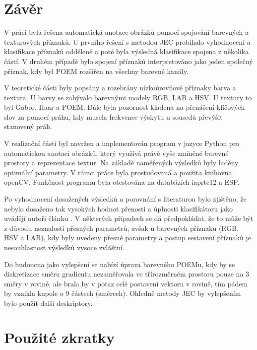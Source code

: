 \documentclass[czech,BP]{thesiskiv}
\begin{document}
\chapter{Závěr}
\par V práci byla řešena automatická anotace obrázků pomocí spojování barevných a texturových příznaků. U prvního řešení s metodou JEC probíhalo vyhodnocení a klasifikace příznaků odděleně a poté byla výsledná klasifikace spojena z několika částí. V druhém případě bylo spojení příznaků interpretováno jako jeden společný příznak, kdy byl POEM rozšířen na všechny barevné kanály.
\par V teoretické části byly popsány a rozebrány nízkoúrovňové příznaky barva a textura. U barvy se zabývalo barevnými modely RGB, LAB a HSV. U textury to byl Gabor, Haar a POEM. Dále byla pozornost kladena na přenášení klíčových slov za pomocí práhu, kdy musela frekvence výskytu u sousedů převýšit stanovený práh. 
\par V realizační části byl navržen a implementován program v jazyce Python pro automatickou anotaci obrázků, který využívá právě vyše zmíněné barevné prostory a reprezentace textur. Na základě naměřených výsledků byly laděny optimální parametry. V rámci práce byla prostudovaná a použita knihovna openCV. Funkčnost programu byla otestována na databázích iaprtc12 a ESP.
\par Po vyhodnocení dosažených výsledků a porovnání s literaturou bylo zjištěno, že nebylo dosaženo tak vysokých hodnot přenosti a úplnosti klasifikátoru jako uvádějí autoři článku \citep{JEC2}. V některých případech se dá předpokládat, že to může být z důvodu neznalosti přesných parametrů, avšak u barevných příznaku (RGB, HSV a LAB), kdy byly uvedeny přesné parametry a postup sestavení příznaků je nesouhlasnost výsledků vysoce zvláštní. 
\par Do budoucna jako vylepšení se nabízí úprava barevného POEMu, kdy by se diskretizace směru gradientu nezaměřovala ve třírozměrném prostoru pouze na 3 směry v rovině, ale brala by v potaz celé postavení vektoru v rovině, tím pádem by vznikla kupole o 9 částech (směrech). Ohledně metody JEC by vylepšením bylo použít další deskriptory. 

% 
%

\chapter{Použité zkratky}
\end{document}

